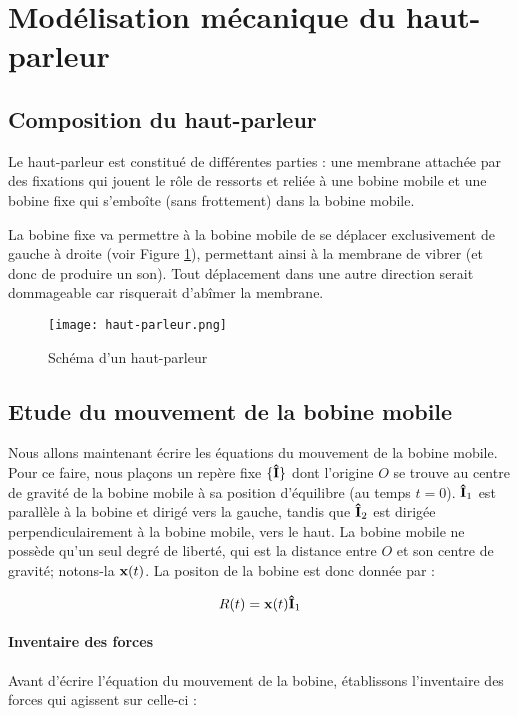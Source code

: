 

\section{Modélisation mécanique du haut-parleur}

\subsection{Composition du haut-parleur}
Le haut-parleur est constitué de différentes parties : une membrane
attachée par des fixations qui jouent le rôle de ressorts et reliée à 
une bobine mobile et une bobine fixe qui s'emboîte (sans frottement) 
dans la bobine mobile.

La bobine fixe va permettre à la bobine mobile de se déplacer exclusivement de gauche
à droite (voir Figure \ref{hp-scheme}), permettant ainsi à la membrane de vibrer 
(et donc de produire un son). Tout déplacement dans une autre direction serait dommageable
car risquerait d'abîmer la membrane.

\begin{figure}[ht!]
	\centering
	\texttt{[image: haut-parleur.png]}
	\caption{Schéma d'un haut-parleur}
	\label{hp-scheme}
\end{figure}

\subsection{Etude du mouvement de la bobine mobile}
Nous allons maintenant écrire les équations du mouvement de la bobine mobile.
Pour ce faire, nous plaçons un repère fixe $\{{\bf\hat{I}}\}$ dont l'origine $O$ se trouve
au centre de gravité de la bobine mobile à sa position d'équilibre (au 
temps $t=0$). ${\bf\hat{ I}}_1$ est parallèle à la bobine et dirigé vers la gauche, tandis que
${\bf\hat{ I}}_2$ est dirigée perpendiculairement à la bobine mobile, vers le haut.
La bobine mobile ne possède qu'un seul degré de liberté, qui
est la distance entre $O$ et son centre de gravité; notons-la ${\bf x}(t)$.
La positon de la bobine est donc donnée par :

$$R(t) = {\bf x}(t) {\bf\hat{ I}}_1$$ 

\paragraph{Inventaire des forces}
Avant d'écrire l'équation du mouvement de la bobine, établissons l'inventaire
des forces qui agissent sur celle-ci :

